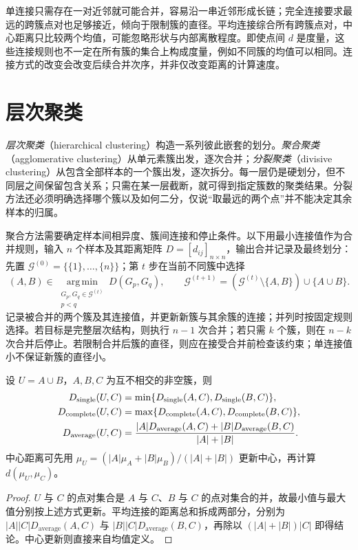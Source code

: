 单连接只需存在一对近邻就可能合并，容易沿一串近邻形成长链；完全连接要求最远的跨簇点对也足够接近，倾向于限制簇的直径。平均连接综合所有跨簇点对，中心距离只比较两个均值，可能忽略形状与内部离散程度。即使点间 $d$ 是度量，这些连接规则也不一定在所有簇的集合上构成度量，例如不同簇的均值可以相同。连接方式的改变会改变后续合并次序，并非仅改变距离的计算速度。

\section{层次聚类}
\label{sec:lh-hierarchical-clustering}

\emph{层次聚类}（hierarchical clustering）构造一系列彼此嵌套的划分。\emph{聚合聚类}（agglomerative clustering）从单元素簇出发，逐次合并；\emph{分裂聚类}（divisive clustering）从包含全部样本的一个簇出发，逐次拆分。每一层仍是硬划分，但不同层之间保留包含关系；只需在某一层截断，就可得到指定簇数的聚类结果。分裂方法还必须明确选择哪个簇以及如何二分，仅说“取最远的两个点”并不能决定其余样本的归属。

聚合方法需要确定样本间相异度、簇间连接和停止条件。以下用最小连接值作为合并规则，输入 $n$ 个样本及其距离矩阵 $D=[d_{ij}]_{n\times n}$，输出合并记录及最终划分：先置 $\mathcal G^{(0)}=\{\{1\},\ldots,\{n\}\}$；第 $t$ 步在当前不同簇中选择
\begin{equation}
(A,B)\in\operatorname*{arg\,min}_{\substack{G_p,G_q\in\mathcal G^{(t)}\\p<q}}
D(G_p,G_q),\qquad
\mathcal G^{(t+1)}=(\mathcal G^{(t)}\setminus\{A,B\})\cup\{A\cup B\}.
\label{eq:lh-cluster-agglomerative-step}
\end{equation}
记录被合并的两个簇及其连接值，并更新新簇与其余簇的连接；并列时按固定规则选择。若目标是完整层次结构，则执行 $n-1$ 次合并；若只需 $k$ 个簇，则在 $n-k$ 次合并后停止。若限制合并后簇的直径，则应在接受合并前检查该约束；单连接值小不保证新簇的直径小。

\begin{proposition}[连接值的递推更新]
\label{prop:lh-cluster-linkage-update}
设 $U=A\cup B$，$A,B,C$ 为互不相交的非空簇，则
\begin{align}
D_{\mathrm{single}}(U,C)&=\min\{D_{\mathrm{single}}(A,C),D_{\mathrm{single}}(B,C)\},
\notag\\
D_{\mathrm{complete}}(U,C)&=\max\{D_{\mathrm{complete}}(A,C),D_{\mathrm{complete}}(B,C)\},
\notag\\
D_{\mathrm{average}}(U,C)&=\frac{|A|D_{\mathrm{average}}(A,C)+|B|D_{\mathrm{average}}(B,C)}{|A|+|B|}.
\label{eq:lh-cluster-linkage-updates}
\end{align}
中心距离可先用 $\mu_U=(|A|\mu_A+|B|\mu_B)/(|A|+|B|)$ 更新中心，再计算 $d(\mu_U,\mu_C)$。
\end{proposition}
\begin{proof}
$U$ 与 $C$ 的点对集合是 $A$ 与 $C$、$B$ 与 $C$ 的点对集合的并，故最小值与最大值分别按上述方式更新。平均连接的距离总和拆成两部分，分别为 $|A||C|D_{\mathrm{average}}(A,C)$ 与 $|B||C|D_{\mathrm{average}}(B,C)$，再除以 $(|A|+|B|)|C|$ 即得结论。中心更新则直接来自均值定义。
\end{proof}

